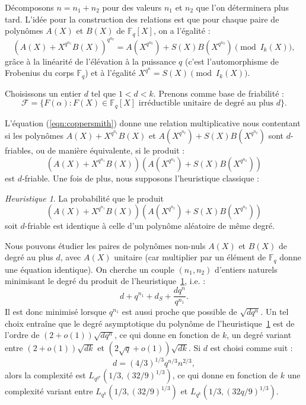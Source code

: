 \documentclass[a4paper, titlepage, 11pt]{article}
\theoremstyle{definition}
\theoremstyle{remark}
\newtheorem{heur}[theo]{Heuristique}
\def\o{o}
\def\gf #1{\mathbb{F}_{#1}}
\begin{document}
Décomposons $n = n_1 + n_2$ pour des valeurs $n_1$ et $n_2$ que l'on déterminera plus tard. L'idée pour la construction des relations est que pour chaque paire de polynômes $A(X)$ et $B(X)$ de $\gf{q}[X]$, on a l'égalité :
\begin{equation}\label{eqn:coppersmith}
{\left( A(X) + X^{q^{n_1}}B(X)\right)}^{q^{n_2}} = A(X^{q^{n_2}}) + S(X)B(X^{q^{n_2}}) \pmod{I_k(X)},
\end{equation}
grâce à la linéarité de l'élévation à la puissance $q$ (c'est l'automorphisme de Frobenius du corps $\gf{q}$) et à l'égalité $X^{q^n} = S(X) \pmod{I_k(X)}$.

Choisissons un entier $d$ tel que $1 < d < k$. Prenons comme base de friabilité :
$$\mathcal{F} =  \{F(\alpha) : F(X) \in \gf{q}[X] \text{ irréductible unitaire de degré au plus } d \}.$$

L'équation (\ref{eqn:coppersmith}) donne une relation multiplicative nous contentant si les polynômes $A(X) + X^{q^{n_1}}B(X)$ et $A(X^{q^{n_2}}) + S(X)B(X^{q^{n_2}})$ sont $d$-friables, ou de manière équivalente, si le produit :
$$\left( A(X) + X^{q^{n_1}}B(X)\right)\left( A(X^{q^{n_2}}) + S(X)B(X^{q^{n_2}})\right)$$
est $d$-friable. Une fois de plus, nous supposons l'heuristique classique :
\begin{heur}\label{heur:polydfriable}
La probabilité que le produit $$\left( A(X) + X^{q^{n_1}}B(X)\right)\left( A(X^{q^{n_2}}) + S(X)B(X^{q^{n_2}})\right)$$ soit $d$-friable est identique à celle d'un polynôme aléatoire de même degré.
\end{heur}

Nous pouvons étudier les paires de polynômes non-nuls $A(X)$ et $B(X)$ de degré au plus $d$, avec $A(X)$ unitaire (car multiplier par un élément de $\gf{q}$ donne une équation identique). On cherche un couple $(n_1, n_2)$ d'entiers naturels minimisant le degré du produit de l'heuristique~\ref{heur:polydfriable}, i.e. :
$$d + q^{n_1} + d_S + \frac{dq^n}{q^{n_1}}.$$
Il est donc minimisé lorsque $q^{n_1}$ est aussi proche que possible de $\sqrt{dq^n}$. Un tel choix entraîne que le degré asymptotique du polynôme de l'heuristique~\ref{heur:polydfriable} est de l'ordre de $(2+\o(1))\sqrt{dq^n}$, ce qui donne en fonction de $k$, un degré variant entre $(2+\o(1))\sqrt{dk}$ et $(2\sqrt{q}+\o(1))\sqrt{dk}$.
Si $d$ est choisi comme suit :
$$d = (4/3)^{1/3}q^{n/3}n^{2/3},$$
alors la complexité est $L_{q^{q^n}}(1/3, (32/9)^{1/3})$, ce qui donne en fonction de $k$ une complexité variant entre $L_{q^k}(1/3, (32/9)^{1/3})$ et $L_{q^k}(1/3, (32q/9)^{1/3})$.
\end{document}
